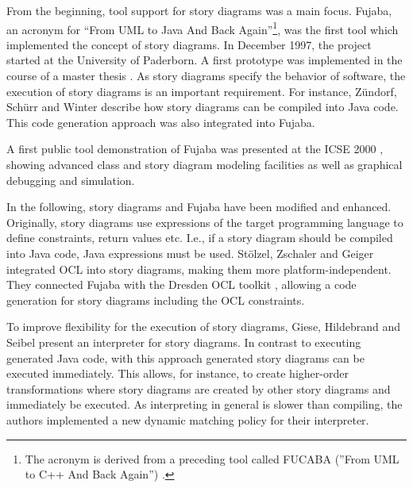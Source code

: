 From the beginning, tool support for story diagrams was a main focus.
Fujaba, an acronym for ``From UML to Java And Back Again''\footnote{The acronym is derived from a preceding tool called FUCABA (''From UML to C++ And Back Again'') \cite{JZ97}.}, was the first tool which implemented the concept of story diagrams.
In December 1997, the project started at the University of Paderborn.
A first prototype was implemented in the course of a master thesis \cite{FNT98}.
As story diagrams specify the behavior of software, the execution of story diagrams is an important requirement.
For instance, Z\"{u}ndorf, Sch\"{u}rr and Winter \cite{ZSW99} describe how story diagrams can be compiled into Java code.
This code generation approach was also integrated into Fujaba.

A first public tool demonstration of Fujaba was presented at the ICSE 2000 \cite{NNZ00}, showing advanced class and story diagram modeling facilities as well as graphical debugging and simulation.

In the following, story diagrams and Fujaba have been modified and enhanced.
Originally, story diagrams use expressions of the target programming language to define constraints, return values etc.
I.e., if a story diagram should be compiled into Java code, Java expressions must be used.
St\"{o}lzel, Zschaler and Geiger \cite{SZG07} integrated OCL into story diagrams, making them more platform-independent.
They connected Fujaba with the Dresden OCL toolkit \cite{DresdenOCL}, allowing a code generation for story diagrams including the OCL constraints.

To improve flexibility for the execution of story diagrams, Giese, Hildebrand and Seibel \cite{GHS09} present an interpreter for story diagrams.
In contrast to executing generated Java code, with this approach generated story diagrams can be executed immediately.
This allows, for instance, to create higher-order transformations where story diagrams are created by other story diagrams and immediately be executed.
As interpreting in general is slower than compiling, the authors implemented a new dynamic matching policy for their interpreter.

